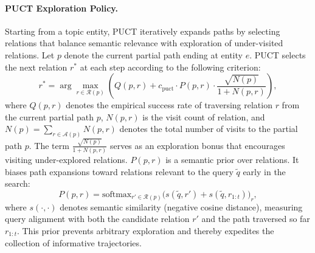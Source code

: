 \documentclass{article}
\newcommand{\sh}[1]{\textcolor{green}{[SH: #1]}}
\newcommand{\jy}[1]{\textcolor{red}{[JY: #1]}}
\theoremstyle{plain}
\theoremstyle{definition}
\theoremstyle{remark}
\begin{document}
\paragraph{PUCT Exploration Policy.} Starting from a topic entity, PUCT iteratively expands paths by selecting relations that balance semantic relevance with exploration of under-visited relations. Let $p$ denote the current partial path ending at entity $e$. PUCT selects the next relation $r^*$ at each step according to the following criterion: \vspace{-2pt}%
\begin{equation}
r^* = \arg\max_{r \in \mathcal{R}(p)} \left( Q(p,r) + c_{\text{puct}} \cdot P(p,r) \cdot \frac{\sqrt{N(p)}}{1 + N(p,r)} \right),
\label{eq:puct}
\end{equation}
where $Q(p,r)$ denotes the empirical success rate of traversing relation $r$ from the current partial path $p$, $N(p,r)$ is the visit count of relation, and $N(p) = \sum_{r \in \mathcal{A}(p)} N(p,r)$ denotes the total number of visits to the partial path $p$. The term $\frac{\sqrt{N(p)}}{1 + N(p,r)}$ serves as an exploration bonus that encourages visiting under-explored relations. 
$P(p,r)$ is a semantic prior over relations. It biases path expansions toward relations relevant to the query $\tilde{q}$ early in the search:
\begin{equation}
P(p,r) = \mathrm{softmax}_{r' \in \mathcal{R}(p)}\Big(s(\tilde{q}, r') + s(\tilde{q}, r_{1:t})\Big)_r,
\label{eq:prior}
\end{equation}
where $s(\cdot, \cdot)$ denotes semantic similarity (negative cosine distance), measuring query alignment with both the candidate relation $r'$ and the path traversed so far $r_{1:t}$. This prior prevents arbitrary exploration and thereby expedites the collection of informative trajectories. 

\end{document}
